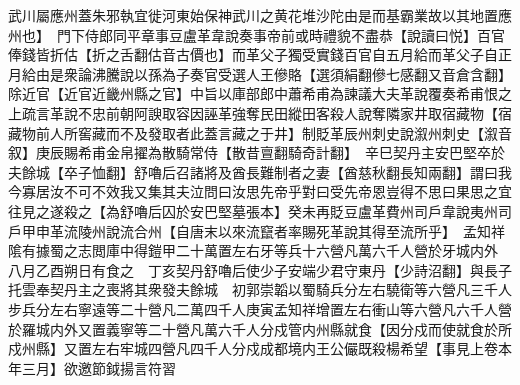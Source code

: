 武川屬應州蓋朱邪執宜徙河東始保神武川之黄花堆沙陀由是而基霸業故以其地置應州也】　門下侍郎同平章事豆盧革韋說奏事帝前或時禮貌不盡恭【說讀曰悦】百官俸錢皆折估【折之舌翻估音古價也】而革父子獨受實錢百官自五月給而革父子自正月給由是衆論沸騰說以孫為子奏官受選人王傪賂【選須絹翻傪七感翻又音倉含翻】除近官【近官近畿州縣之官】中旨以庫部郎中蕭希甫為諫議大夫革說覆奏希甫恨之上疏言革說不忠前朝阿諛取容因誣革強奪民田縱田客殺人說奪隣家井取宿藏物【宿藏物前人所窖藏而不及發取者此蓋言藏之于井】制貶革辰州刺史說溆州刺史【溆音叙】庚辰賜希甫金帛擢為散騎常侍【散昔亶翻騎奇計翻】　辛巳契丹主安巴堅卒於夫餘城【卒子恤翻】舒嚕后召諸將及酋長難制者之妻【酋慈秋翻長知兩翻】謂曰我今寡居汝不可不效我又集其夫泣問曰汝思先帝乎對曰受先帝恩豈得不思曰果思之宜往見之遂殺之【為舒嚕后囚於安巴堅墓張本】癸未再貶豆盧革費州司戶韋說夷州司戶甲申革流陵州說流合州【自唐末以來流竄者率賜死革說其得至流所乎】　孟知祥隂有據蜀之志閲庫中得鎧甲二十萬置左右牙等兵十六營凡萬六千人營於牙城内外　八月乙酉朔日有食之　丁亥契丹舒嚕后使少子安端少君守東丹【少詩沼翻】與長子托雲奉契丹主之喪將其衆發夫餘城　初郭崇韜以蜀騎兵分左右驍衛等六營凡三千人步兵分左右寧遠等二十營凡二萬四千人庚寅孟知祥增置左右衝山等六營凡六千人營於羅城内外又置義寧等二十營凡萬六千人分戍管内州縣就食【因分戍而使就食於所戍州縣】又置左右牢城四營凡四千人分戍成都境内王公儼既殺楊希望【事見上卷本年三月】欲邀節鉞揚言符習

